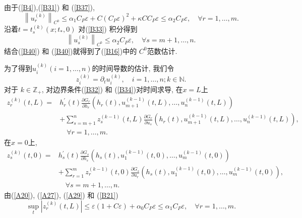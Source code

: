 \documentclass[notitlepage,cs4size,punct,oneside]{ctexrep}
\numberwithin{equation}{chapter}
\theoremstyle{mystyle}
\begin{document}
由于(\ref{B4}),(\ref{B31}) 和 (\ref{B37}),
\begin{equation} \label{B40}
    \left\|u_{r}^{(k)}\right\|_{C^{0}} \leq \alpha_{1} C_{P} \varepsilon+C\left(C_{P} \varepsilon\right)^{2} + \kappa CC_{P} \varepsilon \leq \alpha_{2} C_{P} \varepsilon, \quad \forall r=1, \ldots, m.
\end{equation}
沿着$t=t_{s}^{(k)}\left(x ; t_{*}, 0\right)$ 对(\ref{B33}) 积分得到
\begin{equation} \label{B41}
    \left\|u_{s}^{(k)}\right\|_{C^{0}} \leq \alpha_{2} C_{P} \varepsilon, \quad \forall s=m+1, \ldots, n .
\end{equation}
结合(\ref{B40}) 和 (\ref{B40})就得到了(\ref{B16})中的 $C^{0}$范数估计.

为了得到$u_{i}^{(k)}(i=1, \ldots, n)$的时间导数的估计, 我们令
\begin{equation} \label{B42}
    z_{i}^{(k)}=\partial_{t} u_{i}^{(k)}, \quad i=1, \ldots, n ; k \in \mathbb{N} .
\end{equation}
对于 $k \in \mathbb{Z}_{+}$, 对边界条件(\ref{B32}) 和 (\ref{B34})对时间求导, 在$x=L$上
\begin{align}
    z_{r}^{(k)}(t, L)= & h_{r}^{\prime}(t) \frac{\partial G_{r}}{\partial h_{r}} \left(h_{r}(t), u_{m+1}^{(k-1)}(t, L), \ldots, u_{n}^{(k-1)}(t, L)\right)\nonumber                     \\
                       & +\sum_{s=m+1}^{n} z_{s}^{(k-1)}(t, L) \frac{\partial G_{r}}{\partial u_{s}}\left(h_{r}(t), u_{m+1}^{(k-1)}(t, L), \ldots, u_{n}^{(k-1)}(t, L)\right),\nonumber \\
                       & \quad \forall r=1, \ldots, m. \label{B43}
\end{align}
在$x=0$上,
\begin{align}
    z_{s}^{(k)}(t, 0)= & h_{s}^{\prime}(t) \frac{\partial G_{s}}{\partial h_{s}} \left(h_{s}(t), u_{1}^{(k-1)}(t, 0), \ldots, u_{m}^{(k-1)}(t, 0)\right)\nonumber                   \\
                       & +\sum_{r=1}^{m} z_{r}^{(k-1)}(t, 0) \frac{\partial G_{s}}{\partial u_{r}}\left(h_{s}(t), u_{1}^{(k-1)}(t, 0), \ldots, u_{m}^{(k-1)}(t, 0)\right),\nonumber \\
                       & \quad \forall s=m+1, \ldots, n .\label{B44}
\end{align}
由(\ref{A20}), (\ref{A27}), (\ref{A29}) 和 (\ref{B21})
\begin{equation} \label{B45}
    \sup _{t}\left|z_{r}^{(k)}(t, L)\right| \leq \varepsilon(1+C \varepsilon)+\alpha_{0} C_{P} \varepsilon \leq \alpha_{1} C_{P} \varepsilon, \quad \forall r=1, \ldots, m.
\end{equation}
\end{document}
